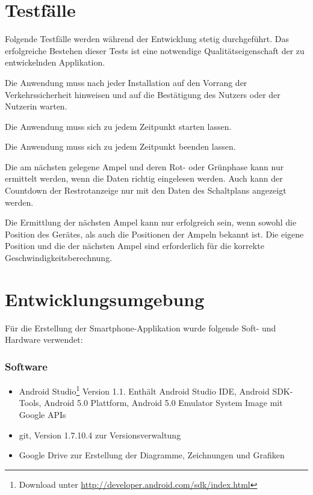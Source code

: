 \section{Testfälle}
Folgende Testfälle werden während der Entwicklung stetig durchgeführt. Das erfolgreiche Bestehen dieser Tests ist eine notwendige Qualitätseigenschaft der zu entwickelnden Applikation.
\begin{description}[leftmargin=0.7cm,style=nextline]
\item[Sicherheitshinweis:] 
Die Anwendung muss nach jeder Installation auf den Vorrang der Verkehrssicherheit hinweisen und auf die Bestätigung des Nutzers oder der Nutzerin warten.\\
\item[Anwendung starten:] 
Die Anwendung muss sich zu jedem Zeitpunkt starten lassen. \\
\item[Anwendung beenden:] 
Die Anwendung muss sich zu jedem Zeitpunkt beenden lassen. \\
\item[Einlesen der Datei:] 
Die am nächsten gelegene Ampel und deren Rot- oder Grünphase kann nur ermittelt werden, wenn die Daten richtig eingelesen werden. Auch kann der Countdown der Restrotanzeige nur mit den Daten des Schaltplans angezeigt werden.\\
\item[Ermittlung der Position:] 
Die Ermittlung der nächsten Ampel kann nur erfolgreich sein, wenn sowohl die Position des Gerätes, als auch die Positionen der Ampeln bekannt ist. Die eigene Position und die der nächsten Ampel sind erforderlich für die korrekte Geschwindigkeitsberechnung.\\
\end{description}
%
%
\clearpage
\section{Entwicklungsumgebung}
Für die Erstellung der Smartphone-Applikation wurde folgende Soft- und Hardware verwendet:
\subsubsection{Software}
\begin{itemize}
	\item Android Studio\footnote{ Download unter \url{http://developer.android.com/sdk/index.html}} Version 1.1. Enthält Android Studio IDE, Android \gls{SDK}-Tools, Android 5.0 Plattform, Android 5.0 Emulator System Image mit Google \glspl{API}
	\item git, Version 1.7.10.4 zur Versionsverwaltung
	\item Google Drive zur Erstellung der Diagramme, Zeichnungen und Grafiken
\end{itemize}
